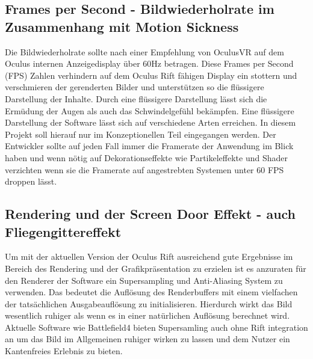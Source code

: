 \documentclass[pagesize, paper=a4, fontsize=12pt,titlepage=true, headings=small, headnosepline, abstractoff, liststotoc, nochapterprefix, plainheadsepline]{scrreprt}
\begin{document}
\subsection{Frames per Second - Bildwiederholrate im Zusammenhang mit Motion Sickness}
Die Bildwiederholrate sollte nach einer Empfehlung von OculusVR auf dem Oculus internen Anzeigedisplay über 60Hz betragen. Diese Frames per Second (FPS) Zahlen verhindern auf dem Oculus Rift fähigen Display ein stottern und verschmieren der gerenderten Bilder und unterstützen so die flüssigere Darstellung der Inhalte. Durch eine flüssigere Darstellung lässt sich die Ermüdung der Augen als auch das Schwindelgefühl bekämpfen. Eine flüssigere Darstellung der Software lässt sich auf verschiedene Arten erreichen. In diesem Projekt soll hierauf nur im Konzeptionellen Teil eingegangen werden. Der Entwickler sollte auf jeden Fall immer die Framerate der Anwendung im Blick haben und wenn nötig auf Dekorationseffekte wie Partikeleffekte und Shader verzichten wenn sie die Framerate auf angestrebten Systemen unter 60 FPS droppen lässt.

\subsection{Rendering und der Screen Door Effekt - auch Fliegengittereffekt}
Um mit der aktuellen Version der Oculus Rift ausreichend gute Ergebnisse im Bereich des Rendering und der Grafikpräsentation zu erzielen ist es anzuraten für den Renderer der Software ein Supersampling und Anti-Aliasing System zu verwenden. Das bedeutet die Auflösung des Renderbuffers mit einem vielfachen der tatsächlichen Ausgabeauflösung zu initialisieren. Hierdurch wirkt das Bild wesentlich ruhiger als wenn es in einer natürlichen Auflösung berechnet wird. Aktuelle Software wie Battlefield4 bieten Supersamling auch ohne Rift integration an um das Bild im Allgemeinen ruhiger wirken zu lassen und dem Nutzer ein Kantenfreies Erlebnis zu bieten. 
\end{document}
